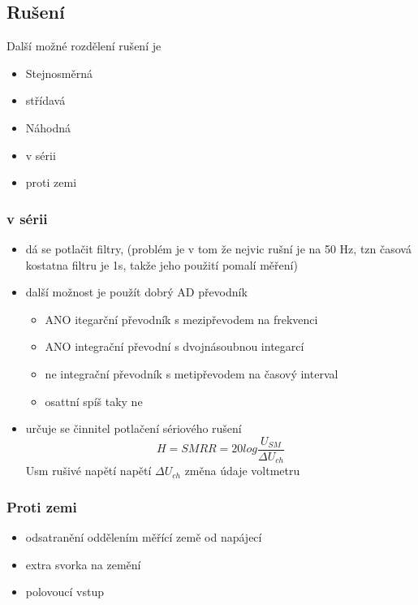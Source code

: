 \subsection{Rušení}
Další možné rozdělení rušení je 
\begin{itemize}
    \item Stejnosměrná
    \item střídavá
    \item Náhodná
    \item v sérii
    \item proti zemi
\end{itemize}

\subsubsection{v sérii}
\begin{itemize}
    \item dá se potlačit filtry, (problém je v tom že nejvic rušní je na 50 Hz, tzn časová kostatna filtru je 1s, takže jeho použití pomalí měření)
    \item další možnost je použít dobrý AD převodník
    \begin{itemize}
        \item ANO itegarční převodník s mezipřevodem na frekvenci
        \item ANO integrační převodní  s dvojnásoubnou integarcí
        \item ne integrační převodník s metipřevodem na časový interval
        \item osattní spíš taky ne
    \end{itemize}
    \item určuje se činnitel potlačení sériového rušení
        \begin{equation}
            H=SMRR= 20log\frac{U_{SM}}{\Delta U_{ch}}
        \end{equation}
        Usm rušivé napětí napětí $ \Delta U_{ch} $ změna údaje voltmetru
\end{itemize}

\subsubsection{Proti zemi}
\begin{itemize}
    \item odsatranění oddělením měřící země od napájecí
    \item extra svorka na zemění
    \item polovoucí vstup
\end{itemize}

